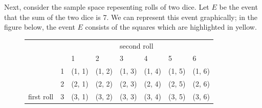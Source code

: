 \documentclass[12pt]{article}
\theoremstyle{definition}
\theoremstyle{remark}
\begin{document}
Next, consider the sample space repesenting rolls of two dice. Let $E$ be the event that the sum of the two dice is 7. We can represent this event graphically; in the figure below, the event $E$ consists of the squares which are highlighted in yellow.

\begin{figure}[H]
\centering
\label{two-dice-sum-seven}
\begin{tabular}{llllllll}
           &                        &                                                     &                                                     & \multicolumn{2}{l}{second roll}                                                                           &                                                     &                                                     \\
           &                        & 1                                                   & 2                                                   & 3                                                   & 4                                                   & 5                                                   & 6                                                   \\ \cline{3-8} 
           & \multicolumn{1}{l|}{1} & (1, 1)                                              & (1, 2)                                              & (1, 3)                                              & (1, 4)                                              & \multicolumn{1}{l|}{(1, 5)}                         & \multicolumn{1}{l|}{\cellcolor[HTML]{F8FF00}(1, 6)} \\ \cline{7-8} 
           & \multicolumn{1}{l|}{2} & (2, 1)                                              & (2, 2)                                              & (2, 3)                                              & \multicolumn{1}{l|}{(2, 4)}                         & \multicolumn{1}{l|}{\cellcolor[HTML]{F8FF00}(2, 5)} & \multicolumn{1}{l|}{(2, 6)}                         \\ \cline{6-7}
first roll & \multicolumn{1}{l|}{3} & (3, 1)                                              & (3, 2)                                              & \multicolumn{1}{l|}{(3, 3)}                         & \multicolumn{1}{l|}{\cellcolor[HTML]{F8FF00}(3, 4)} & (3, 5)                                              & \multicolumn{1}{l|}{(3, 6)}                         \\ \cline{5-6}

\end{tabular}
\end{figure}
\end{document}
